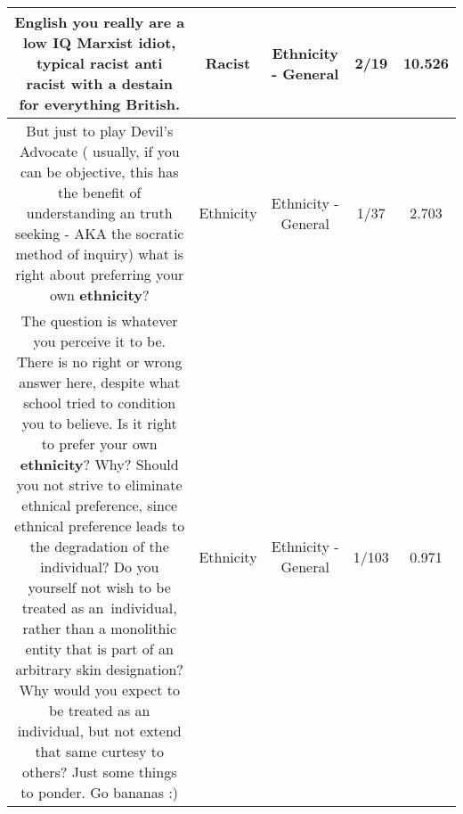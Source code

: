 \documentclass[11pt]{article}
\newlength\mylength
\begin{document}
\begin{center}
\begin{longtable}{|C{.65\mylength}|C{.30\mylength}|C{.12\mylength}|C{.12\mylength}|C{.12\mylength}|}
  \small English you really are a low IQ Marxist idiot, typical \textbf{racist} anti \textbf{racist} with a  destain for everything British.\normalsize   & Racist & Ethnicity - General & 2/19 & 10.526 \\  \hline
  \small But just to play Devil's Advocate ( usually, if you can be objective, this has the benefit of understanding an truth seeking - AKA the socratic method of inquiry) what is right about preferring your own \textbf{ethnicity}?\normalsize   & Ethnicity & Ethnicity - General & 1/37 & 2.703 \\  \hline
  \small The question is whatever you perceive it to be. There is no right or wrong answer here, despite what school tried to condition you to believe. Is it right to prefer your own \textbf{ethnicity}? Why? Should you not strive to eliminate ethnical preference, since ethnical preference leads to the degradation of the individual? Do you yourself not wish to be treated as an individual, rather than a monolithic entity that is part of an arbitrary skin designation? Why would you expect to be treated as an individual, but not extend that same curtesy to others? Just some things to ponder. Go bananas :)\normalsize   & Ethnicity & Ethnicity - General & 1/103 & 0.971 \\  \hline

\end{longtable}
\end{center}
\end{document}
